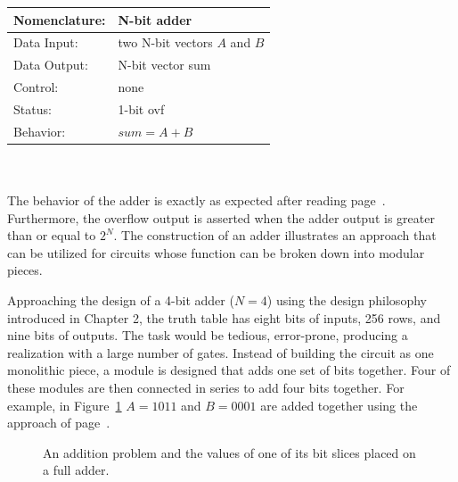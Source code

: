 \begin{tabular}{|l|p{3.5in}|} \hline                    
Nomenclature:  & N-bit adder				\\ \hline
Data Input:    & two N-bit vectors $A$ and $B$		\\ \hline
Data Output:   & N-bit vector sum			\\ \hline
Control:       & none					\\ \hline
Status:        & 1-bit ovf 				\\ \hline
Behavior:      & $sum = A+B$				\\ \hline
\end{tabular}
\\ \\
The behavior of the adder is exactly as expected after reading
page~\pageref{page:addition}.  Furthermore, the overflow output is asserted 
when the adder output is greater than or equal to $2^N$.  The construction 
of an adder illustrates an approach that can be utilized for circuits 
whose function can be broken down into modular pieces. 

Approaching the design of a 4-bit adder ($N=4$) using the design 
philosophy introduced in Chapter 2, the truth table has eight bits
of inputs, 256 rows, and nine bits of outputs.  The task would be tedious,
error-prone, producing a realization with a large number of 
gates.  Instead of building the circuit as one monolithic piece, a module 
is designed that adds one set of bits together.  Four of these modules are
then connected in series to add four bits together.
For example, in Figure~\ref{fig:add} $A=1011$ and $B=0001$ are added
together using the approach of page~\pageref{page:addition}.

\begin{figure}[ht]
\caption{An addition problem and the values of one of its
bit slices placed on a full adder.}
\label{fig:add}
\end{figure}

